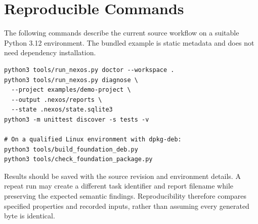 \section{Reproducible Commands}
The following commands describe the current source workflow on a suitable Python 3.12 environment. The bundled example is static metadata and does not need dependency installation.
\begin{lstlisting}[caption={Current foundation workflow}]
python3 tools/run_nexos.py doctor --workspace .
python3 tools/run_nexos.py diagnose \
  --project examples/demo-project \
  --output .nexos/reports \
  --state .nexos/state.sqlite3
python3 -m unittest discover -s tests -v

# On a qualified Linux environment with dpkg-deb:
python3 tools/build_foundation_deb.py
python3 tools/check_foundation_package.py
\end{lstlisting}

Results should be saved with the source revision and environment details. A repeat run may create a different task identifier and report filename while preserving the expected semantic findings. Reproducibility therefore compares specified properties and recorded inputs, rather than assuming every generated byte is identical.
